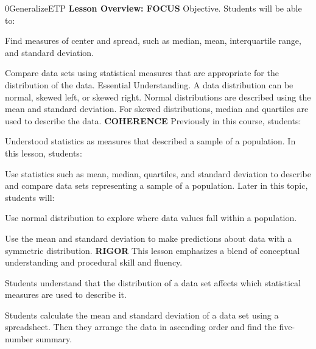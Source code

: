 \documentclass{article}
\newenvironment{te-addendum}[2]{}{}     %
\begin{document}
\begin{te-addendum}{0}{GeneralizeETP}
\textbf{Lesson Overview: FOCUS}
Objective. Students will be able to:
\item Find measures of center and spread, such as median, mean, interquartile range, and standard deviation.
\item Compare data sets using statistical measures that are appropriate for the distribution of the data.
Essential Understanding. A data distribution can be normal, skewed left, or skewed right. Normal distributions are described using the mean and standard deviation. For skewed distributions, median and quartiles are used to describe the data.
\textbf{COHERENCE}
Previously in this course, students:
\item Understood statistics as measures that described a sample of a population.
In this lesson, students:
\item Use statistics such as mean, median, quartiles, and standard deviation to describe and compare data sets representing a sample of a population.
Later in this topic, students will:
\item Use normal distribution to explore where data values fall within a population.
\item Use the mean and standard deviation to make predictions about data with a symmetric distribution.
\textbf{RIGOR}
This lesson emphasizes a blend of conceptual understanding and procedural skill and fluency.
\item Students understand that the distribution of a data set affects which statistical measures are used to describe it.
\item Students calculate the mean and standard deviation of a data set using a spreadsheet. Then they arrange the data in ascending order and find the five-number summary.
\end{te-addendum}
\end{document}
